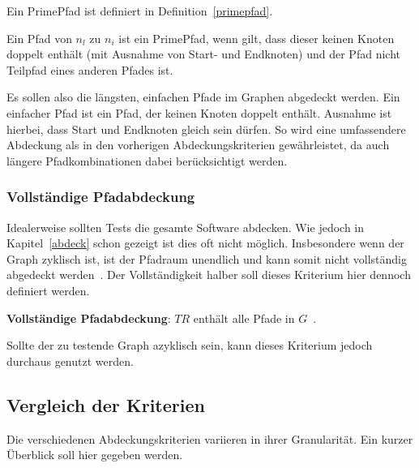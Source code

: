 Ein PrimePfad ist definiert in Definition~\ref{primepfad}.

\begin{definition}
    Ein Pfad von $n_{l}$ zu $n_{i}$ ist ein PrimePfad, wenn gilt, dass dieser keinen Knoten doppelt enthält (mit Ausnahme von Start- und Endknoten) und
    der Pfad nicht Teilpfad eines anderen Pfades ist.
    \label{primepfad}
\end{definition}

Es sollen also die längsten, einfachen Pfade im Graphen abgedeckt werden.
Ein einfacher Pfad ist ein Pfad, der keinen Knoten doppelt enthält.
Ausnahme ist hierbei, dass Start und Endknoten gleich sein dürfen.
So wird eine umfassendere Abdeckung als in den vorherigen Abdeckungskriterien gewährleistet, da auch längere Pfadkombinationen dabei berücksichtigt werden.

\subsubsection{Vollständige Pfadabdeckung}

Idealerweise sollten Tests die gesamte Software abdecken.
Wie jedoch in Kapitel~\ref{abdeck} schon gezeigt ist dies oft nicht möglich.
Insbesondere wenn der Graph zyklisch ist, ist der Pfadraum unendlich und kann somit nicht vollständig abgedeckt werden~\cite[vgl. S. 36 ]{software-testing}.
Der Vollständigkeit halber soll dieses Kriterium hier dennoch definiert werden.

\begin{definition}
    \textbf{Vollständige Pfadabdeckung}: $TR$ enthält alle Pfade in $G$~\cite[vgl. Criterion 2.7]{software-testing}.
    \label{completecov}
\end{definition}

Sollte der zu testende Graph azyklisch sein, kann dieses Kriterium jedoch durchaus genutzt werden.

\subsection{Vergleich der Kriterien}
\label{vglkrits}
Die verschiedenen Abdeckungskriterien variieren in ihrer Granularität.
Ein kurzer Überblick soll hier gegeben werden.

